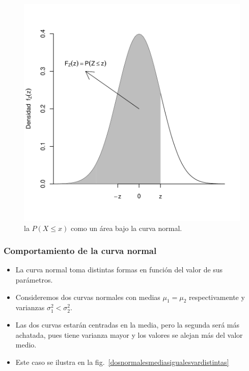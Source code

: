\begin{frame}[fragile]
\begin{figure}[htbp]
\begin{center}
\includegraphics{./dibujos/02/-008}

\end{center}
\caption{la $P(X\leq x)$ como un área bajo la curva normal.}
	\label{areacurvanormalgeneralderecha}
\end{figure}
\end{frame}
 
 \subsubsection{Comportamiento de la curva normal}
\begin{frame}
\begin{itemize}
\item  La curva normal toma distintas formas en función del valor de sus pa\-rá\-me\-tros.
\item  Consideremos dos curvas normales con medias $\mu_1=\mu_2$ respectivamente y varianzas $\sigma_1^2<\sigma_2^2$.
\item  Las dos curvas estarán centradas en la media, pero la segunda será más achatada, pues tiene varianza mayor y los valores se alejan más  del valor medio.
\item  Este caso se ilustra en la fig.~\ref{dosnormalesmediasigualesvardistintas}
 \end{itemize}
\end{frame}

